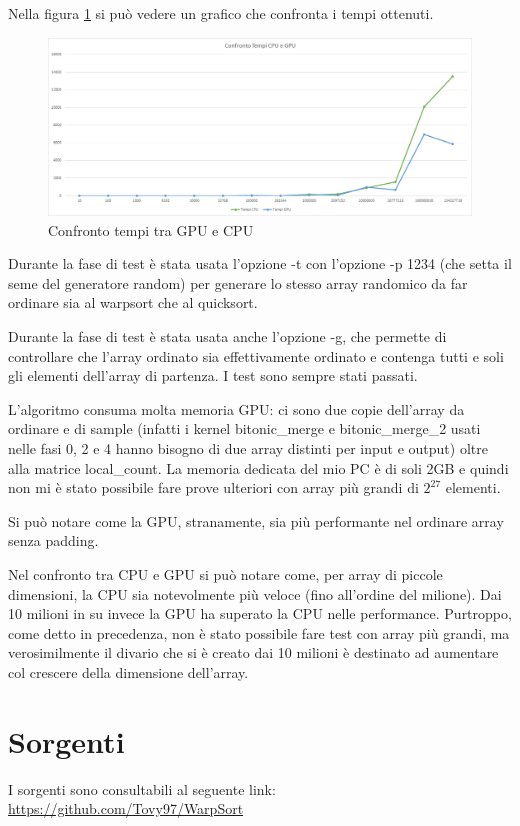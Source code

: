 \documentclass[a4paper, 11pt]{article}
\begin{document}
		Nella figura \ref{fig:confrontotempi} si può vedere un grafico che confronta i tempi ottenuti.
		
		\begin{figure}
			\centering
			\includegraphics[width=0.99\linewidth]{img/ConfrontoTempi}
			\caption{Confronto tempi tra GPU e CPU}
			\label{fig:confrontotempi}
		\end{figure}
		
		Durante la fase di test è stata usata l'opzione -t con l'opzione -p 1234 (che setta il seme del generatore random) 
		per generare lo stesso array randomico da far ordinare sia al warpsort che al quicksort.
		
		Durante la fase di test è stata usata anche l'opzione -g, che permette di controllare che l'array ordinato sia effettivamente ordinato
		e contenga tutti e soli gli elementi dell'array di partenza. I test sono sempre stati passati.
		
		L'algoritmo consuma molta memoria GPU: ci sono due copie dell'array da ordinare e di sample 
		(infatti i kernel bitonic\_merge e bitonic\_merge\_2 usati nelle fasi 0, 2 e 4 hanno bisogno di due array distinti per input e output)
		oltre alla matrice local\_count.
		La memoria dedicata del mio PC è di soli 2GB e quindi non mi è stato possibile fare prove ulteriori 
		con array più grandi di $2^{27}$ elementi.
		
		Si può notare come la GPU, stranamente, sia più performante nel ordinare array senza padding.
		
		Nel confronto tra CPU e GPU si può notare come, per array di piccole dimensioni, la CPU sia notevolmente più veloce (fino all'ordine del 
		milione). Dai 10 milioni in su invece la GPU ha superato la CPU nelle performance. Purtroppo, come detto in precedenza, non è stato 
		possibile fare 
		test con array più grandi, ma verosimilmente il divario che si è creato dai 10 milioni è destinato ad aumentare col crescere 
		della dimensione dell'array.
	\section{Sorgenti}
		\label{sorgenti}
		I sorgenti sono consultabili al seguente link: \url{https://github.com/Tovy97/WarpSort}
		
	\newpage
	\printbibliography		
\end{document}
